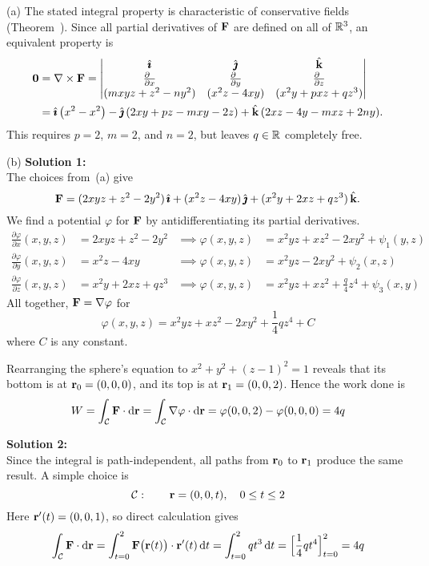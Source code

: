 \begin{solution} 
(a)
The stated integral property is characteristic of conservative fields (Theorem~).
Since all partial derivatives of $\mathbf{F}$ are defined on all of $\mathbb{R}^3$,
an equivalent property is
\begin{align*}
\vZero &= \nabla\times\vF
= \left|\begin{matrix} \hi & \hj & \hk \\ 
      \frac{\partial\hfill}{\partial x} & \frac{\partial\hfill}{\partial y} & \frac{\partial\hfill}{\partial z} \\
(mxyz + z^2 - ny^2) & (x^2 z - 4xy) & (x^2y + pxz + qz^3) \end{matrix}\right|
\\
&= \hi\,\big(x^2-x^2\big) - \hj\,(2xy+pz-mxy-2z) + \hk\,(2xz-4y-mxz+2ny).
\end{align*}
This requires $p=2$, $m=2$, and $n=2$, but leaves $q\in\mathbb{R}$ completely free.

(b) 
\textbf{Solution 1:}\\
The choices from~(a) give
$$
\mathbf{F} 
= (2xyz + z^2 - 2y^2)\,\hat{\pmb{\imath}} + (x^2 z - 4xy)\,\hat{\pmb{\jmath}} + (x^2y + 2xz + qz^3)\,\hat{\mathbf{k}}.
$$
We find a potential $\varphi$ for $\mathbf{F}$ by antidifferentiating its partial derivatives.
\begin{align*}
\frac{\partial \varphi}{\partial x}(x,y,z) &= 2xyz + z^2 - 2y^2 &\implies \varphi(x,y,z)&=x^2yz+xz^2-2xy^2+\psi_1(y,z)\\
\frac{\partial \varphi}{\partial y}(x,y,z) &= x^2 z - 4xy  &\implies \varphi(x,y,z)&=x^2yz-2xy^2+\psi_2(x,z)\\
\frac{\partial \varphi}{\partial z}(x,y,z) &= x^2y + 2xz + qz^3 &\implies \varphi(x,y,z)&=x^2yz+xz^2+\frac{q}{4}z^4+\psi_3(x,y)
\end{align*}
All together, $\mathbf{F}=\nabla\varphi$ for
$$
\varphi(x,y,z) = x^2 y z + x z^2 - 2 x y^2 + \frac{1}{4}q z^4 + C
$$
where $C$ is any constant.

Rearranging the sphere's equation to $x^2 + y^2 + (z-1)^2 = 1$
reveals that its bottom is at $\mathbf{r}_0 = (0,0,0)$, and its top is at 
$\mathbf{r}_1 = (0,0,2)$.
Hence the work done is
$$
W 
= \int_{\mathcal{C}} \mathbf{F}\cdot \mathrm{d}\mathbf{r}
= \int_{\mathcal{C}} \nabla\varphi\cdot \mathrm{d}\mathbf{r}
= \varphi(0,0,2) - \varphi(0,0,0)
= 4q
$$

\textbf{Solution 2:}\\
Since the integral is path-independent,
all paths from $\mathbf{r}_0$ to $\mathbf{r}_1$ produce
the same result.  A simple choice is
$$
\mathcal{C}:\qquad \mathbf{r} = (0,0,t),\quad 0\le t\le 2
$$
Here $\mathbf{r}'(t) = (0,0,1)$, so direct calculation gives
$$
\int_{\mathcal{C}} \mathbf{F}\cdot \mathrm{d}\mathbf{r}
= \int_{t=0}^2 \mathbf{F}\big(\mathbf{r}(t)\big)\cdot\mathbf{r}'(t)\,\mathrm{d}t
= \int_{t=0}^2 qt^3\,\mathrm{d}t
= \Big[\frac{1}{4}qt^4\Big]_{t=0}^2 = 4q
$$
\end{solution}


